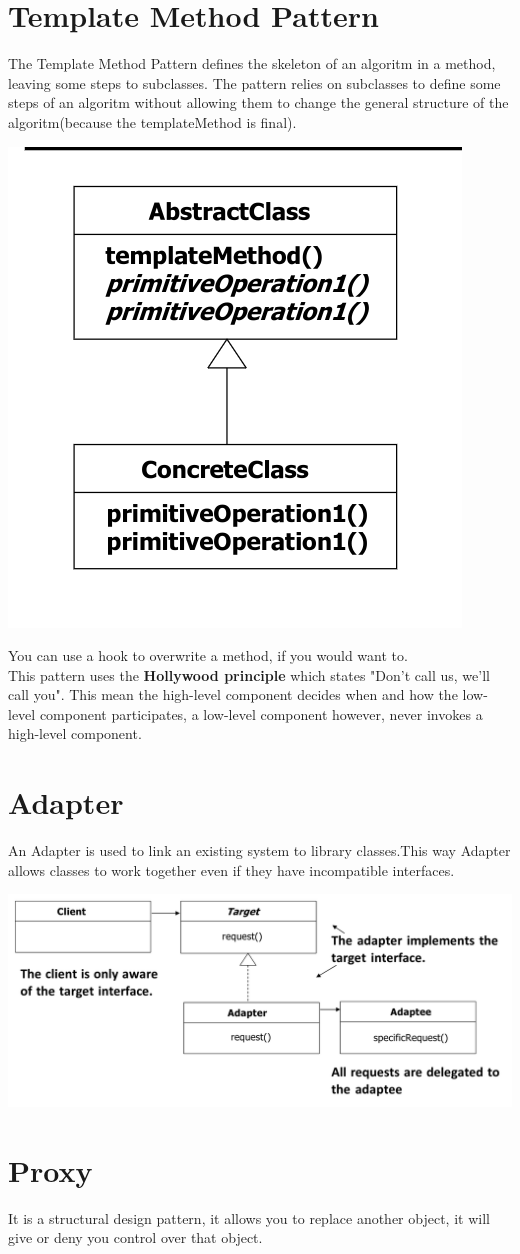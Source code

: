 \documentclass{report}
\begin{document}
   	\chapter{Template Method Pattern}
   		The Template Method Pattern defines the skeleton of an algoritm in a method, leaving some steps to subclasses. The pattern relies on subclasses to define some steps of an algoritm without allowing them to change the general structure of the algoritm(because the templateMethod is final). 
   		\begin{center}
   			\includegraphics[scale=0.6]{template_method}
   		\end{center} 
   		You can use a hook to overwrite a method, if you would want to. 
   		\\
   		This pattern uses the \textbf{Hollywood principle} which states "Don't call us, we'll call you". This mean the high-level component decides when and how the low-level component participates, a low-level component however, never invokes a high-level component.
	\chapter{Adapter}
		An Adapter is used to link an existing system to library classes.This way Adapter allows classes to work together even if they have incompatible interfaces.
		\begin{center}
			\includegraphics[scale=0.3]{adapter}
		\end{center}
	\chapter{Proxy} 
		It is a structural design pattern, it allows you to replace another object, it will give or deny you control over that object. 
\end{document}
